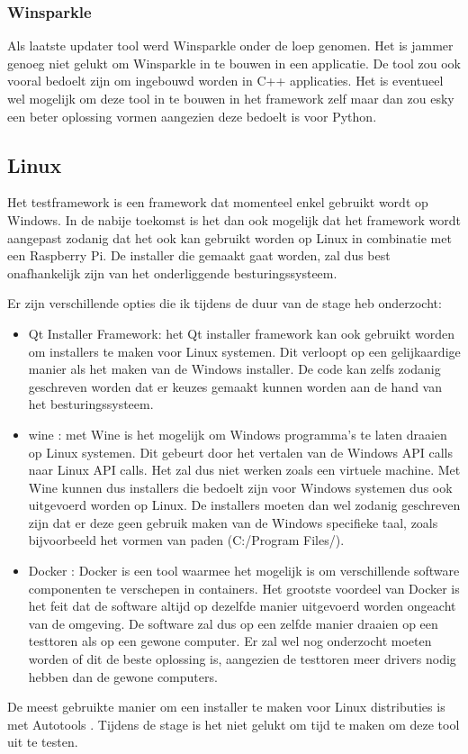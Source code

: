 \documentclass{article}
\begin{document}
\subsubsection{Winsparkle}
Als laatste updater tool werd Winsparkle onder de loep genomen.
Het is jammer genoeg niet gelukt om Winsparkle in te bouwen in een applicatie.
De tool zou ook vooral bedoelt zijn om ingebouwd worden in C++ applicaties.
Het is eventueel wel mogelijk om deze tool in te bouwen in het framework zelf maar dan zou esky een beter oplossing vormen aangezien deze bedoelt is voor Python.

\subsection{Linux}
Het testframework is een framework dat momenteel enkel gebruikt wordt op Windows.
In de nabije toekomst is het dan ook mogelijk dat het framework wordt aangepast zodanig dat het ook kan gebruikt worden op Linux in combinatie met een Raspberry Pi.
De installer die gemaakt gaat worden, zal dus best onafhankelijk zijn van het onderliggende besturingssysteem.

Er zijn verschillende opties die ik tijdens de duur van de stage heb onderzocht:
\begin{itemize}

\item Qt Installer Framework: het Qt installer framework kan ook gebruikt worden om installers te maken voor Linux systemen.
Dit verloopt op een gelijkaardige manier als het maken van de Windows installer.
De code kan zelfs zodanig geschreven worden dat er keuzes gemaakt kunnen worden aan de hand van het besturingssysteem. 

\item wine \citep{wineMain}: met Wine is het mogelijk om Windows programma's te laten draaien op Linux systemen.
Dit gebeurt door het vertalen van de Windows API calls naar Linux API calls.
Het zal dus niet werken zoals een virtuele machine.
Met Wine kunnen dus installers die bedoelt zijn voor Windows systemen dus ook uitgevoerd worden op Linux.
De installers moeten dan wel zodanig geschreven zijn dat er deze geen gebruik maken van de Windows specifieke taal, zoals bijvoorbeeld het vormen van paden (C:/Program Files/).

\item Docker \citep{dockerMain}: Docker is een tool waarmee het mogelijk is om verschillende software componenten te verschepen in containers.
Het grootste voordeel van Docker is het feit dat de software altijd op dezelfde manier uitgevoerd worden ongeacht van de omgeving.
De software zal dus op een zelfde manier draaien op een testtoren als op een gewone computer.
Er zal wel nog onderzocht moeten worden of dit de beste oplossing is, aangezien de testtoren meer drivers nodig hebben dan de gewone computers.

\end{itemize}
De meest gebruikte manier om een installer te maken voor Linux distributies is met Autotools \citep{autoMain}.
Tijdens de stage is het niet gelukt om tijd te maken om deze tool uit te testen.
\end{document}
